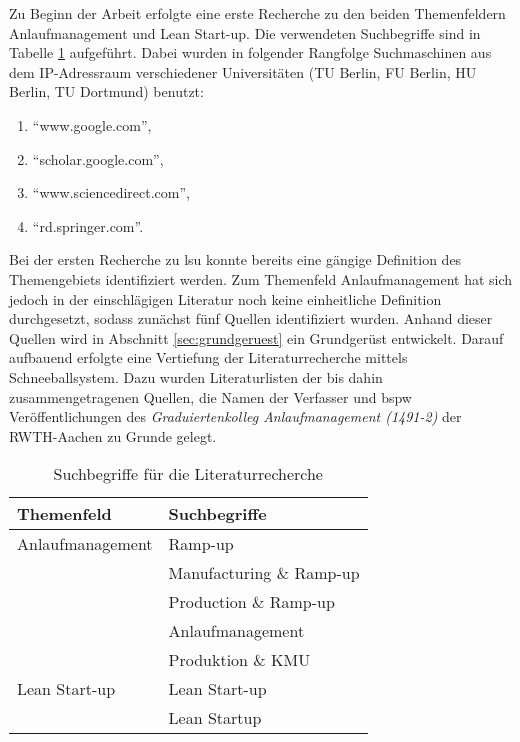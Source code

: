 Zu Beginn der Arbeit erfolgte eine erste Recherche zu den beiden Themenfeldern Anlaufmanagement und Lean Start-up. Die verwendeten Suchbegriffe sind in Tabelle \ref{tab:algorythm} aufgeführt. Dabei wurden in folgender Rangfolge Suchmaschinen aus dem IP-Adressraum verschiedener Universitäten (TU Berlin, FU Berlin, HU Berlin, TU Dortmund) benutzt: 
\begin{enumerate}
 \item ``www.google.com'',
 \item ``scholar.google.com'',
 \item ``www.sciencedirect.com'',
 \item ``rd.springer.com''.
 \end{enumerate}
Bei der ersten Recherche zu \gls{lsu} konnte bereits eine gängige Definition des Themengebiets identifiziert werden. 
Zum Themenfeld Anlaufmanagement hat sich jedoch in der einschlägigen Literatur noch keine einheitliche Definition durchgesetzt, sodass zunächst fünf Quellen identifiziert wurden. Anhand dieser Quellen wird in Abschnitt \ref{sec:grundgeruest} ein Grundgerüst entwickelt. 
% 
% 
Darauf aufbauend erfolgte eine Vertiefung der Literaturrecherche mittels Schneeballsystem. Dazu wurden Literaturlisten der bis dahin zusammengetragenen Quellen, die Namen der Verfasser und \gls{bspw} Veröffentlichungen des \textit{Graduiertenkolleg Anlaufmanagement (1491-2)} der RWTH-Aachen zu Grunde gelegt. 
 \begin{table}[h]
\caption{Suchbegriffe für die Literaturrecherche} \label{tab:algorythm} 
\begin{center}
\begin{tabular}{l l}
\textbf{Themenfeld} & \textbf{Suchbegriffe}\\ \hline
Anlaufmanagement & Ramp-up \\
& Manufacturing \& Ramp-up \\ 
& Production \& Ramp-up \\ 
& Anlaufmanagement  \\
& Produktion \& KMU  \\ \hline
Lean Start-up & Lean Start-up \\
& Lean Startup
 \end{tabular} 
 \end{center}
\end{table}

